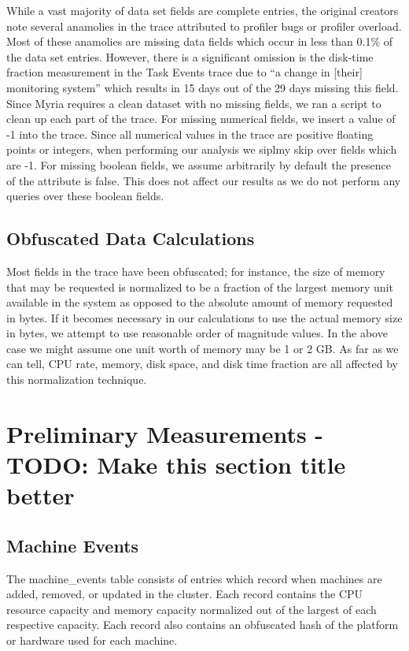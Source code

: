 \documentclass{sig-alternate}
\begin{document}
While a vast majority of data set fields are complete entries, the original creators note several anamolies in the trace attributed to profiler bugs or profiler overload.
Most of these anamolies are missing data fields which occur in less than 0.1\% of the data set entries.
However, there is a significant omission is the disk-time fraction measurement in the Task Events trace due to ``a change in [their] monitoring system'' which results in 15 days out of the 29 days missing this field.
Since Myria requires a clean dataset with no missing fields, we ran a script to clean up each part of the trace.
For missing numerical fields, we insert a value of -1 into the trace.
Since all numerical values in the trace are positive floating points or integers, when performing our analysis we siplmy skip over fields which are -1.
For missing boolean fields, we assume arbitrarily by default the presence of the attribute is false.
This does not affect our results as we do not perform any queries over these boolean fields.

\subsection{Obfuscated Data Calculations}

Most fields in the trace have been obfuscated; for instance, the size of memory that may be requested is normalized to be a fraction of the largest memory unit available in the system as opposed to the absolute amount of memory requested in bytes.
If it becomes necessary in our calculations to use the actual memory size in bytes, we attempt to use reasonable order of magnitude values.
In the above case we might assume one unit worth of memory may be 1 or 2 GB.
As far as we can tell, CPU rate, memory, disk space, and disk time fraction are all affected by this normalization technique.

\section{Preliminary Measurements - TODO: Make this section title better}

\subsection{Machine Events}

The machine\_events table consists of entries which record when machines are added, removed, or updated in the cluster.
Each record contains the CPU resource capacity and memory capacity normalized out of the largest of each respective capacity.
Each record also contains an obfuscated hash of the platform or hardware used for each machine.
\end{document}
